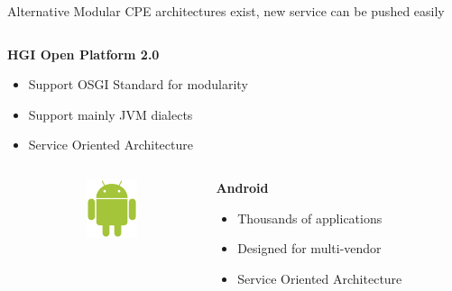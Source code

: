 \documentclass[a4paper]{beamer}
\begin{document}
\begin{frame}{Alternative Modular CPE architectures exist, new service can be pushed easily}
\begin{columns}[T]
																						
		\begin{column}[T]{0.70 \textwidth} 
																																	
																																		   
			\textbf{ HGI Open Platform 2.0}
			\begin{itemize}
				\item Support OSGI Standard for modularity
				\item Support mainly JVM dialects
				\item Service Oriented Architecture
			\end{itemize}
			\vspace{3mm}
																																		     
																																	
		\end{column}
																						
	\end{columns}
				
				
	\begin{columns}[T]
		\begin{column}{.01\textwidth} %
											
		\end{column}
		\begin{column}[T]{0.15 \textwidth} 
			\vspace{1em}
			\includegraphics[width=4em]{droid.png}
		\end{column}
																		
																						
		\begin{column}[T]{0.70 \textwidth} 
																																	
																																		   
			\textbf{ Android}
			\begin{itemize}
				\item Thousands of applications
				\item Designed for multi-vendor
				\item Service Oriented Architecture
			\end{itemize}
			\vspace{5mm}
																																		     
																																	
		\end{column}
																						

\end{columns}
\end{frame}
\end{document}
